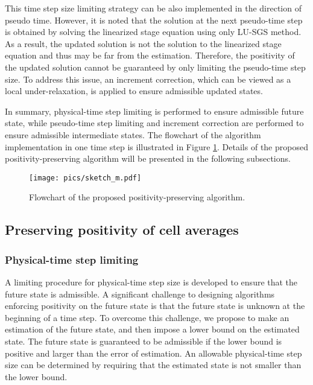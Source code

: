 This time step size limiting strategy can be also implemented in the direction of pseudo time. However, it is noted that the solution at the next pseudo-time step is obtained by solving the linearized stage equation using only LU-SGS method. As a result, the updated solution is not the solution to the linearized stage equation and thus may be far from the estimation. Therefore, the positivity of the updated solution cannot be guaranteed by only limiting the pseudo-time step size. To address this issue, an increment correction, which can be viewed as a local under-relaxation, is applied to ensure admissible updated states. 


In summary, physical-time step limiting is performed to ensure admissible future state, while pseudo-time step limiting and increment correction are performed to ensure admissible intermediate states. The flowchart of the algorithm implementation in one time step is illustrated in Figure \ref{fig:sketch}. Details of the proposed positivity-preserving algorithm will be presented in the following subsections.

\begin{figure}[htbp!]
    \centering
    \texttt{[image: pics/sketch\_m.pdf]}
    \caption{Flowchart of the proposed positivity-preserving algorithm.}
    \label{fig:sketch}
\end{figure}

\subsection{Preserving positivity of cell averages}
\subsubsection{Physical-time step limiting}
\label{ssec:physical-limiting}
A limiting procedure for physical-time step size is developed to ensure that the future state is admissible. A significant challenge to designing algorithms enforcing positivity on the future state is that the future state is unknown at the beginning of a time step. To overcome this challenge, we propose to make an estimation of the future state, and then impose a lower bound on the estimated state. The future state is guaranteed to be admissible if the lower bound is positive and larger than the error of estimation. An allowable physical-time step size can be determined by requiring that the estimated state is not smaller than the lower bound. 

